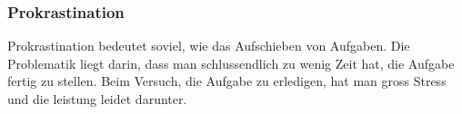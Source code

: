 \subsubsection{Prokrastination}
Prokrastination bedeutet soviel, wie das Aufschieben von Aufgaben. Die Problematik liegt darin, dass man schlussendlich zu wenig Zeit hat, die Aufgabe fertig zu stellen. Beim Versuch, die Aufgabe zu erledigen, hat man gross Stress und die leistung leidet darunter.
